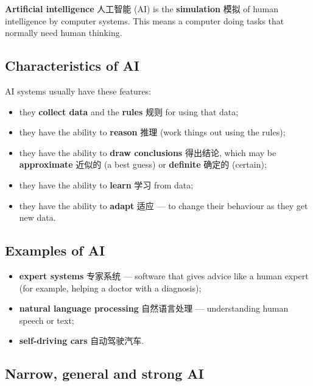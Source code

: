 \documentclass[11pt]{article}
\begin{document}
\textbf{Artificial intelligence} 人工智能 (AI) is the \textbf{simulation} 模拟 of human intelligence by computer systems. This means a computer doing tasks that normally need human thinking.

\subsection*{Characteristics of AI}

AI systems usually have these features:

\begin{itemize}
\item they \textbf{collect data} and the \textbf{rules} 规则 for using that data;

\item they have the ability to \textbf{reason} 推理 (work things out using the rules);

\item they have the ability to \textbf{draw conclusions} 得出结论, which may be \textbf{approximate} 近似的 (a best guess) or \textbf{definite} 确定的 (certain);

\item they have the ability to \textbf{learn} 学习 from data;

\item they have the ability to \textbf{adapt} 适应 — to change their behaviour as they get new data.

\end{itemize}

\subsection*{Examples of AI}

\begin{itemize}
\item \textbf{expert systems} 专家系统 — software that gives advice like a human expert (for example, helping a doctor with a diagnosis);

\item \textbf{natural language processing} 自然语言处理 — understanding human speech or text;

\item \textbf{self-driving cars} 自动驾驶汽车.

\end{itemize}

\subsection*{Narrow, general and strong AI}
\end{document}
